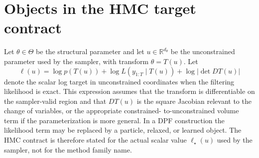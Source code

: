 \section{Objects in the HMC target contract}
\label{sec:bf-dpf-hmc-contract}

Let $\theta\in\Theta$ be the structural parameter and let
$u\in\mathbb{R}^{d_\theta}$ be the unconstrained parameter used by the sampler,
with transform $\theta=T(u)$.  Let
\[
  \ell(u)
  =
  \log p(T(u))+\log L(y_{1:T}\mid T(u))+\log\left|\det DT(u)\right|
\]
denote the scalar log target in unconstrained coordinates when the filtering
likelihood is exact.  This expression assumes that the transform is
differentiable on the sampler-valid region and that $DT(u)$ is the square
Jacobian relevant to the change of variables, or the appropriate constrained-
to-unconstrained volume term if the parameterization is more general.  In a DPF
construction the likelihood term may be replaced by a particle, relaxed, or
learned object.  The HMC contract is therefore stated for the actual scalar
value $\ell_\star(u)$ used by the sampler, not for the method family name.

